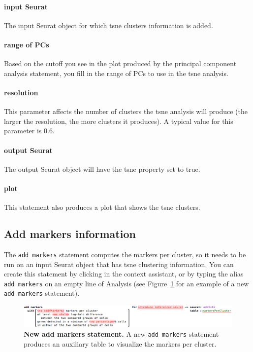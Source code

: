 \paragraph{input Seurat} The input Seurat object for which tsne clusters information is added.

\paragraph{range of PCs} Based on the cutoff you see in the plot produced by the principal
component analysis statement, you fill in the range of PCs to use in the tsne analysis.

\paragraph{resolution} This parameter affects the number of clusters the tsne analysis will
produce (the larger the resolution, the more clusters it produces).
A typical value for this parameter is 0.6.

\paragraph{output Seurat} The output Seurat object will have the tsne property set to true.

\paragraph{plot} This statement also produces a plot that shows the tsne clusters.

\subsection{Add markers information}
The \texttt{add markers} statement computes the markers per cluster, so it needs to be
run on an input Seurat object that has tsne clustering information.
You can create this statement by clicking
 in the context assistant, or by typing
the alias \texttt{add markers} on an empty line of Analysis (see Figure~\ref{fig:AddMarkers}
for an example of a new \texttt{add markers} statement).

\begin{figure}[h!tbp]
  \centering
    \includegraphics[width=\figWidthWide]{figures/AddMarkers.png}
    \caption[New add markers statement.]{\textbf{New add markers statement.} A new
    \texttt{add markers} statement produces an auxiliary table to visualize the markers
    per cluster.}
\label{fig:AddMarkers}
\end{figure}


